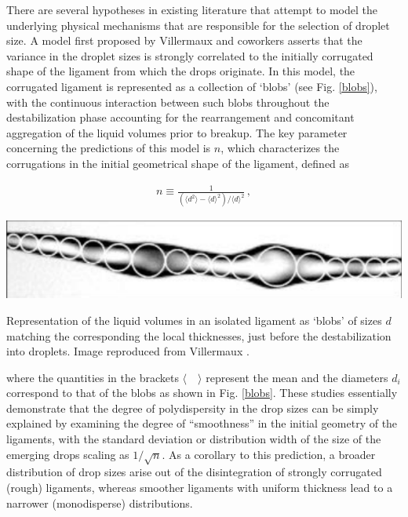 There are several hypotheses in existing literature  
that attempt to model the underlying physical mechanisms 
that are responsible for the selection of droplet size. 
A model first proposed by Villermaux and coworkers 
asserts that the variance in the droplet sizes is strongly 
correlated to the initially corrugated shape of the 
ligament from which the drops originate. 
In this model, the corrugated ligament is represented as a collection 
of `blobs' (see Fig. \ref{blobs}), with the continuous interaction between 
such blobs throughout the destabilization phase accounting for the 
rearrangement and concomitant aggregation of the liquid volumes prior to breakup. 
The key parameter concerning the predictions of this model 
is $n$, which characterizes the corrugations in the initial 
geometrical shape of the ligament, defined as  

\begin{align}
	n \equiv \frac{1}{\left(\langle d^{2} \rangle - \langle d \rangle^{2} \right) / \langle d \rangle^{2}} \, ,  
\end{align}

\begin{marginfigure}
\centering
\includegraphics{plots/ligament_breakup/lig_protoblobs.png}
\caption{Representation of the liquid volumes in an isolated ligament as `blobs'
	of sizes $d$ matching the corresponding the local thicknesses, 
	just before the destabilization into droplets. 
	Image reproduced from Villermaux \cite{vill_1}.
	}
\label{blobs}
\end{marginfigure}


where the quantities in the brackets $\langle \quad \rangle$ represent the mean
and the diameters $d_i$ correspond to that of the blobs as shown in Fig. \ref{blobs}.
These studies essentially demonstrate that the degree of polydispersity 
in the drop sizes can be simply explained by examining the 
degree of ``smoothness'' in the initial geometry of the ligaments, 
with the standard deviation or distribution width of the size of the 
emerging drops scaling as $1 / \sqrt{n}$. 
As a corollary to this prediction, a broader distribution of drop sizes arise out
of the disintegration of strongly corrugated (rough) ligaments, whereas smoother 
ligaments with uniform thickness lead to a narrower (monodisperse) distributions. 


